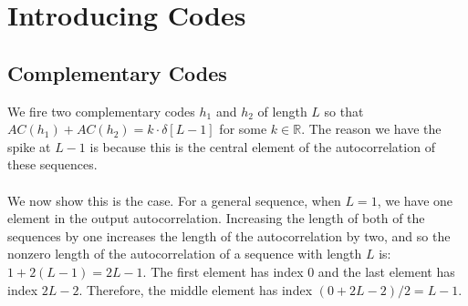 \documentclass[a4paper]{article}
\begin{document}
\section*{Introducing Codes}
\subsection*{Complementary Codes}
We fire two complementary codes $h_1$ and $h_2$ of length $L$ so that $AC(h_1) + AC(h_2) = k\cdot \delta[L-1]$ for some $k \in \mathbb{R}$. The reason we have the spike at $L-1$ is because this is the central element of the autocorrelation of these sequences.
\\\\
We now show this is the case. For a general sequence, when $L = 1$, we have one element in the output autocorrelation. Increasing the length of both of the sequences by one increases the length of the autocorrelation by two, and so the nonzero length of the autocorrelation of a sequence with length $L$ is: $1+2(L-1) = 2L-1$. The first element has index 0 and the last element has index $2L-2$. Therefore, the middle element has index $(0+2L-2)/2 = L -1$.
\end{document}
